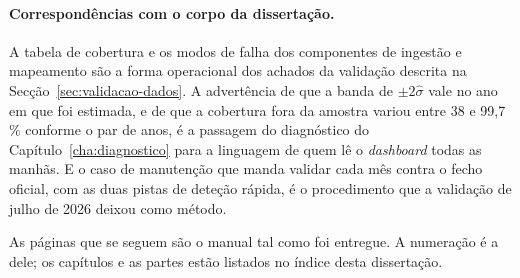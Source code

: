 \paragraph{Correspondências com o corpo da dissertação.} A tabela de cobertura
e os modos de falha dos componentes de ingestão e mapeamento são a forma
operacional dos achados da validação descrita na
Secção~\ref{sec:validacao-dados}. A advertência de que a banda de $\pm2\hat\sigma$
vale no ano em que foi estimada, e de que a cobertura fora da amostra variou
entre 38 e 99,7\,\% conforme o par de anos, é a passagem do
diagnóstico do Capítulo~\ref{cha:diagnostico} para a linguagem de quem lê o
\emph{dashboard} todas as manhãs. E o caso de manutenção que manda validar
cada mês contra o fecho oficial, com as duas pistas de deteção rápida, é o
procedimento que a validação de julho de 2026 deixou como método.

\medskip
\noindent As páginas que se seguem são o manual tal como foi entregue. A
numeração é a dele; os capítulos e as partes estão listados no índice desta
dissertação.

\clearpage

